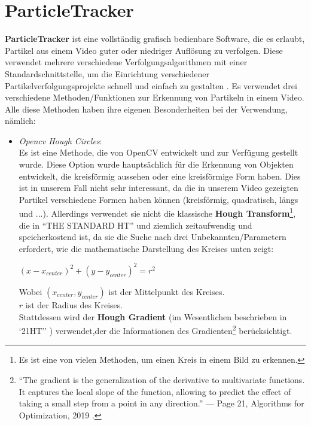 \section{ParticleTracker \label{kap1_ParticleTracker}}
\textbf{ParticleTracker} ist eine vollständig grafisch bedienbare Software, die es erlaubt, Partikel aus einem Video guter oder niedriger Auflösung zu verfolgen. Diese verwendet mehrere verschiedene Verfolgungsalgorithmen mit einer Standardschnittstelle, um die Einrichtung verschiedener Partikelverfolgungsprojekte schnell und einfach zu gestalten \cite{Smith2021}.
Es verwendet drei verschiedene Methoden/Funktionen zur Erkennung von Partikeln in einem Video. Alle diese Methoden haben ihre eigenen Besonderheiten bei der Verwendung, nämlich:
\begin{itemize}
   \item \textit{Opencv Hough Circles}:\\ Es ist eine Methode, die von OpenCV\cite{opencv_library} entwickelt und zur Verfügung gestellt wurde. Diese Option wurde hauptsächlich für die Erkennung von Objekten entwickelt, die kreisförmig aussehen oder eine kreisförmige Form haben. Dies ist in unserem Fall nicht sehr interessant, da die in unserem Video gezeigten Partikel verschiedene Formen haben können (kreisförmig, quadratisch, längs und ...). Allerdings verwendet sie nicht die klassische \textbf{Hough Transform}\footnote{Es ist eine von vielen Methoden, um einen Kreis in einem Bild zu erkennen.}, die in ``THE STANDARD HT'' \cite{comparative_hough_transform} und ziemlich zeitaufwendig und speicherkostend ist, da sie die Suche nach drei Unbekannten/Parametern erfordert, wie die mathematische Darstellung des Kreises unten zeigt:\\
\begin{center}
 $(x- x_{center})^{2} + (y - y_{center})^{2} = r^{2}$ \\
\end{center}
Wobei $(x_{center},y_{center})$ ist der Mittelpunkt des Kreises.\\
      $r$ ist der Radius des Kreises.\\
      

Stattdessen wird der \textbf{Hough Gradient} (im Wesentlichen beschrieben in `21HT'' \cite{comparative_hough_transform}) verwendet,der die Informationen des Gradienten\footnote{``The gradient is the generalization of the derivative to multivariate functions. It captures the local slope of the function, allowing to predict the effect of taking a small step from a point in any direction.'' — Page 21, Algorithms for Optimization, 2019 \cite{algo_optimi_2019}.} berücksichtigt.
      

\end{itemize}
